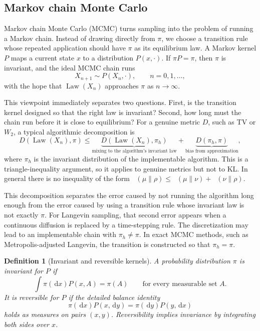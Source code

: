 \documentclass[10pt,a4paper]{amsart}
\numberwithin{equation}{section}
\newtheorem{defn}[theorem]{Definition}
\DeclareMathOperator{\KL}{D_{\mathsf{KL}}}
\DeclareMathOperator{\Law}{Law}
\newcommand{\dd}{\,\mathrm{d}}
\begin{document}
\subsection{Markov chain Monte Carlo}

Markov chain Monte Carlo (MCMC) turns sampling into the problem of running a
Markov chain.  Instead of drawing directly from $\pi$, we choose a transition
rule whose repeated application should have $\pi$ as its equilibrium law.  A
Markov kernel $P$ maps a current state $x$ to a distribution $P(x,\cdot)$.  If
$\pi P=\pi$, then $\pi$ is invariant, and the ideal MCMC chain runs
\[
    X_{n+1}\sim P(X_n,\cdot),\qquad n=0,1,\ldots,
\]
with the hope that $\Law(X_n)$ approaches $\pi$ as $n\to\infty$.

This viewpoint immediately separates two questions.  First, is the transition
kernel designed so that the right law is invariant?  Second, how long must the
chain run before it is close to equilibrium?  For a genuine metric $D$, such as
TV or $W_2$, a typical algorithmic decomposition is
\[
    D(\Law(X_n),\pi)
    \leq
    \underbrace{D(\Law(X_n),\pi_h)}_{\text{mixing to the algorithm's invariant law}}
    +
    \underbrace{D(\pi_h,\pi)}_{\text{bias from approximation}},
\]
where $\pi_h$ is the invariant distribution of the implementable algorithm.
This is a triangle-inequality argument, so it applies to genuine metrics but
not to KL\@.  In general there is no inequality of the form
$\KL(\mu\|\rho)\leq\KL(\mu\|\nu)+\KL(\nu\|\rho)$.



This decomposition separates the error caused by not running the algorithm long
enough from the error caused by using a transition rule whose invariant law is
not exactly $\pi$.  For Langevin sampling, that second error appears when a
continuous diffusion is replaced by a time-stepping rule.  The discretization
may lead to an implementable chain with $\pi_h\neq\pi$.  In exact MCMC methods,
such as Metropolis-adjusted Langevin, the transition is constructed so that
$\pi_h=\pi$.

\begin{defn}[Invariant and reversible kernels]
A probability distribution $\pi$ is \emph{invariant} for $P$ if
\[
    \int \pi(\dd x)P(x,A)=\pi(A)
    \qquad\text{for every measurable set }A.
\]
It is \emph{reversible} for $P$ if the detailed balance identity
\[
    \pi(\dd x)P(x,\dd y)=\pi(\dd y)P(y,\dd x)
\]
holds as measures on pairs $(x,y)$.  Reversibility implies invariance by
integrating both sides over $x$.
\end{defn}
\end{document}
